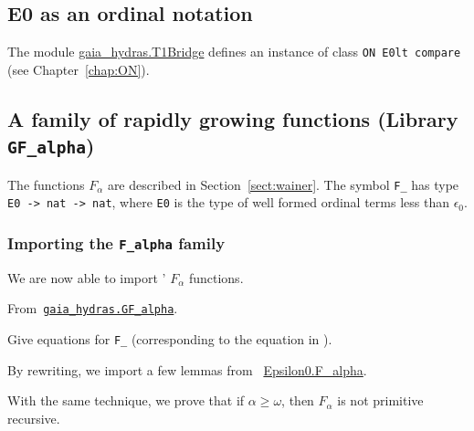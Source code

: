 
\subsection{E0 as an ordinal notation}
The module \href{../theories/html/gaia_hydras.T1Bridge.html}{gaia\_hydras.T1Bridge} defines an instance of class \texttt{ON E0lt compare}
(see Chapter~\ref{chap:ON}).








\subsection{A family of rapidly growing functions
(Library \texttt{GF\_alpha})}

The functions $F_\alpha$ are described in Section~\vref{sect:wainer}. The symbol \texttt{F\_} has type \texttt{E0 -> nat -> nat},
where \texttt{E0} is the type of well formed ordinal terms less than $\epsilon_0$.

\subsubsection{Importing the \texttt{F\_alpha} family}

We are now able to import \HydrasLib' $F_\alpha$ functions.

From~\href{../theories/html/gaia_hydras.G~F_alpha.html}%
{\texttt{gaia\_hydras.GF\_alpha}}.


\begin{todo}
  Give equations for \texttt{F\_} (corresponding to the equation
  in \HydrasLib).
\end{todo}






By rewriting, we import a few lemmas from
~\href{../theories/html/hydras.Epsilon0.F_alpha.html}{Epsilon0.F\_alpha}.




With the same technique, we prove that if
$\alpha\geq\omega$, then $F_\alpha$ is not primitive recursive.

